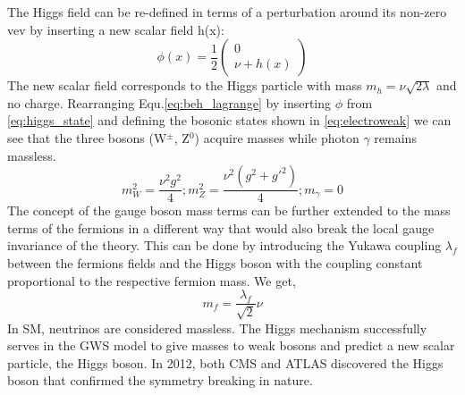 \begin{itemize}
\begin{equation}
\end{equation}
The Higgs field can be re-defined in terms of a perturbation around its non-zero vev by inserting a new scalar field h(x):
\begin{equation}\label{eq:higgs_state}
\phi(x) = \frac{1}{2}\left(\begin{array}{c}
0\\
\nu + h(x)
\end{array}\right)
\end{equation}
The new scalar field corresponds to the Higgs particle with mass $m_{h} = \nu\sqrt{2\lambda}$ and no charge. Rearranging Equ.\ref{eq:beh_lagrange} by inserting $\phi$ from \ref{eq:higgs_state} and defining the bosonic states shown in \ref{eq:electroweak} we can see that the three bosons (W$^{\pm}$, Z$^{0}$) acquire masses while photon $\gamma$ remains massless.
\begin{equation}
m_{W}^{2} = \frac{\nu^{2}g^{2}}{4} ; m_{Z}^{2} = \frac{\nu^{2}(g^{2} + g'^{2})}{4} ; m_{\gamma} = 0 
\end{equation}
The concept of the gauge boson mass terms can be further extended to the mass terms of the fermions in a different way that would also break the local gauge invariance of the theory. This can be done by introducing the Yukawa coupling $\lambda_{f}$ between the fermions fields and the Higgs boson with the coupling constant proportional to the respective fermion mass. We get,
\begin{equation}
m_{f} = \frac{\lambda_{f}}{\sqrt{2}}\nu
\end{equation}
In SM, neutrinos are considered massless.
The Higgs mechanism successfully serves in the GWS model to give masses to weak bosons and predict a new scalar particle, the Higgs boson. In 2012, both CMS and ATLAS discovered the Higgs boson that confirmed the symmetry breaking in nature.
\end{itemize}

